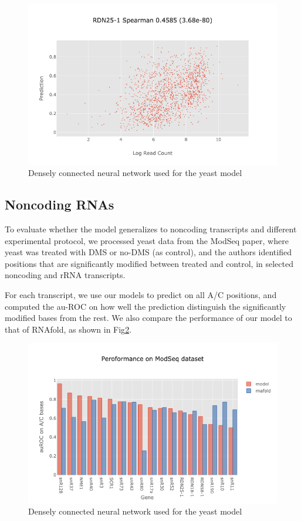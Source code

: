 \documentclass{proposal}
\begin{document}
\begin{figure}[h!]
\includegraphics[width=\textwidth]{yeast_r25_performance.png}
\caption{Densely connected neural network used for the yeast model}
\label{fig:yeast_r25_performance}
\centering
\end{figure}


\subsection{Noncoding RNAs}

To evaluate whether the model generalizes to noncoding transcripts and different experimental protocol,
we processed yeast data from the ModSeq paper\cite{talkish2014mod},
where yeast was treated with DMS or no-DMS (as control),
and the authors identified positions that are significantly modified between treated and control,
in selected noncoding and rRNA transcripts.

For each transcript, we use our models to predict on all A/C positions,
and computed the au-ROC on how well the prediction distinguish the significantly modified bases from the rest.
We also compare the performance of our model to that of RNAfold, as shown in Fig\ref{fig:yeast_modseq_performance}.

\begin{figure}[h!]
\includegraphics[width=\textwidth]{yeast_modseq_performance.png}
\caption{Densely connected neural network used for the yeast model}
\label{fig:yeast_modseq_performance}
\centering
\end{figure}
\end{document}
